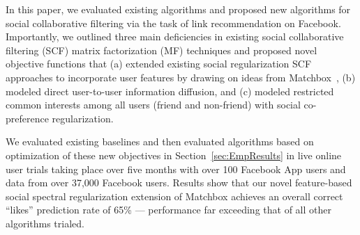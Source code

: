 

In this paper, we evaluated existing algorithms and proposed new
algorithms for social collaborative filtering via the task of link
recommendation on Facebook.  Importantly, we outlined three main
deficiencies in existing social collaborative filtering (SCF) matrix
factorization (MF) techniques and proposed novel objective functions
that (a) extended existing social regularization SCF 
approaches to incorporate user features by drawing on ideas
from Matchbox~\cite{matchbox}, (b) modeled direct user-to-user information
diffusion, and (c) modeled restricted common interests among all
users (friend and non-friend) with social co-preference regularization.

We evaluated existing baselines and then evaluated algorithms based
on optimization of these new objectives
in Section~\ref{sec:EmpResults} in live online user trials
taking place over five months with over 100 Facebook App users and data from over
37,000 Facebook users.  Results show that our novel feature-based
social spectral regularization extension of Matchbox achieves an
overall correct ``likes'' prediction rate of 65\% --- performance
far exceeding that of all other algorithms trialed.


